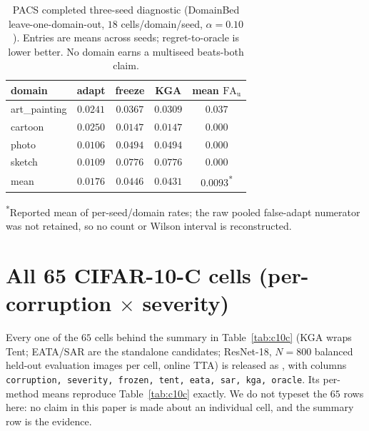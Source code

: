 \documentclass[conference]{IEEEtran}
\theoremstyle{plain}
\theoremstyle{definition}
\begin{document}
\begin{table}[tb]\centering\small
\caption{PACS completed three-seed diagnostic (DomainBed leave-one-domain-out,
$18$ cells/domain/seed, $\alpha{=}0.10$). Entries are means across seeds; regret-to-oracle is
lower better. No domain earns a multiseed beats-both claim.}
\label{tab:pacs}
\setlength{\tabcolsep}{2.5pt}
\begin{tabular}{lcccc}
\toprule
domain & adapt & freeze & \textbf{\textsc{KGA}} & mean $\mathrm{FA}_{\mathrm u}$ \\
\midrule
art\_painting & $0.0241$ & $0.0367$ & $0.0309$ & $0.037$ \\
cartoon       & $0.0250$ & $0.0147$ & $0.0147$ & $0.000$ \\
photo         & $0.0106$ & $0.0494$ & $0.0494$ & $0.000$ \\
sketch        & $0.0109$ & $0.0776$ & $0.0776$ & $0.000$ \\
\midrule
mean          & $0.0176$ & $0.0446$ & $0.0431$ & $0.0093$\textsuperscript{*} \\
\bottomrule
\end{tabular}
\par\vspace{2pt}\footnotesize\textsuperscript{*}Reported mean of per-seed/domain rates;
the raw pooled false-adapt numerator was not retained, so no count or Wilson interval is reconstructed.
\end{table}




\section{All 65 CIFAR-10-C cells (per-corruption $\times$ severity)}\label{app:c10c}
Every one of the $65$ cells behind the summary in Table~\ref{tab:c10c}
(\textsc{KGA} wraps Tent; EATA/SAR are the standalone candidates; ResNet-18, $N{=}800$ balanced
held-out evaluation images per cell, online TTA) is released as
, with columns
\texttt{corruption, severity, frozen, tent, eata, sar, kga, oracle}. Its per-method means reproduce
Table~\ref{tab:c10c} exactly. We do not typeset the $65$ rows here: no claim in this paper is made
about an individual cell, and the summary row is the evidence.
\end{document}
